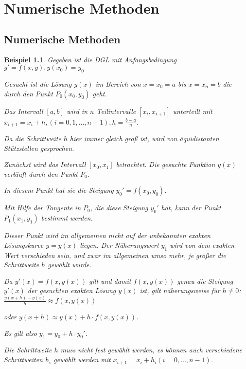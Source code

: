 \documentclass[fontset=ubuntu,12pt,a4paper]{scrreprt}
\newtheorem{beispiel}[defi]{Beispiel}
\begin{document}
\chapter{Numerische Methoden}
    \section{Numerische Methoden}
    \begin{beispiel}
        Gegeben ist die DGL mit Anfangsbedingung \(y'=f(x,y), y(x_0)=y_0\)
     
        Gesucht ist die Lösung \(y(x)\) im Bereich von \(x=x_0=a\) bis \(x=x_n=b\) die durch den Punkt \(P_0(x_0,y_0)\) geht.

        Das Intervall \(\left[a,b\right]\) wird in \(n\) Teilintervalle \(\left[x_i,x_{i+1}\right]\) unterteilt mit \(x_{i+1}=x_i+h, (i=0,1,\dots,n-1), h=\frac{b-a}{n}\).
        

        Da die Schrittweite \(h\) hier immer gleich groß ist, wird von äquidistanten Stützstellen gesprochen.

        Zunächst wird das Intervall \(\left[x_0,x_1\right]\) betrachtet. Die gesuchte Funktion \(y(x)\) verläuft durch den Punkt \(P_0\).

        In diesem Punkt hat sie die Steigung \(y_0'=f(x_0,y_0)\).

        Mit Hilfe der Tangente in \(P_0\), die diese Steigung \(y_0'\) hat, kann der Punkt \(P_1(x_1,y_1)\) bestimmt werden.


        Dieser Punkt wird im allgemeinen nicht auf der unbekannten exakten Lösungskurve \(y=y(x)\) liegen. Der Näherungswert \(y_1\) wird von dem exakten Wert verschieden sein, und zwar im allgemeinen umso mehr, je größer die Schrittweite \(h\) gewählt wurde.

        Da \(y'(x)=f(x,y(x))\) gilt und damit \(f(x,y(x))\) genau die Steigung \(y'(x)\) der gesuchten exakten Lösung \(y(x)\) ist, gilt näherungsweise für \(h\neq0\): \(\frac{y(x+h)-y(x)}{h}\approx f(x,y(x))\)
        
        oder \(y(x+h)\approx y(x)+h\cdot f(x,y(x))\).
        
        Es gilt also \(y_1=y_0+h\cdot y_0'\).
        
        Die Schrittweite \(h\) muss nicht fest gewählt werden, es können auch verschiedene Schrittweiten \(h_i\) gewählt werden mit \(x_{i+1}=x_i+h_i (i=0,\dots,n-1)\).
    \end{beispiel}
\end{document}
